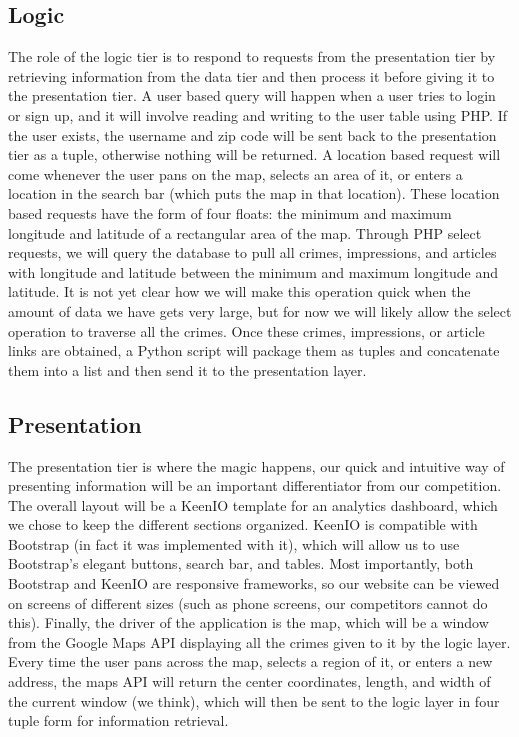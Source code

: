 \documentclass[paper=a4, fontsize=11pt]{scrartcl} %
\numberwithin{equation}{section} %
\numberwithin{figure}{section} %
\numberwithin{table}{section} %
\begin{document}

\subsection{Logic}

The role of the logic tier is to respond to requests from the presentation tier by retrieving information from the data tier and then process it before giving it to the presentation tier. A user based query will happen when a user tries to login or sign up, and it will involve reading and writing to the user table using PHP. If the user exists, the username and zip code will be sent back to the presentation tier as a tuple, otherwise nothing will be returned.  A location based request will come whenever the user pans on the map, selects an area of it, or enters a location in the search bar (which puts the map in that location). These location based requests have the form of four floats: the minimum and maximum longitude and latitude of a rectangular area of the map. Through PHP select requests, we will query the database to pull all crimes, impressions, and articles with longitude and latitude between the minimum and maximum longitude and latitude. It is not yet clear how we will make this operation quick when the amount of data we have gets very large, but for now we will likely allow the select operation to traverse all the crimes. Once these crimes, impressions, or article links are obtained, a Python script will package them as tuples and concatenate them into a list and then send it to the presentation layer.


\subsection{Presentation}

The presentation tier is where the magic happens, our quick and intuitive way of presenting information will be an important differentiator from our competition. The overall layout will be a KeenIO template for an analytics dashboard, which we chose to keep the different sections organized. KeenIO is compatible with Bootstrap (in fact it was implemented with it), which will allow us to use Bootstrap's elegant buttons, search bar, and tables. Most importantly, both Bootstrap and KeenIO are responsive frameworks, so our website can be viewed on screens of different sizes (such as phone screens, our competitors cannot do this). Finally, the driver of the application is the map, which will be a window from the Google Maps API displaying all the crimes given to it by the logic layer. Every time the user pans across the map, selects a region of it, or  enters a new address, the maps API will return the center coordinates, length, and width of the current window (we think), which will then be sent to the logic layer in four tuple form for information retrieval.
\end{document}
